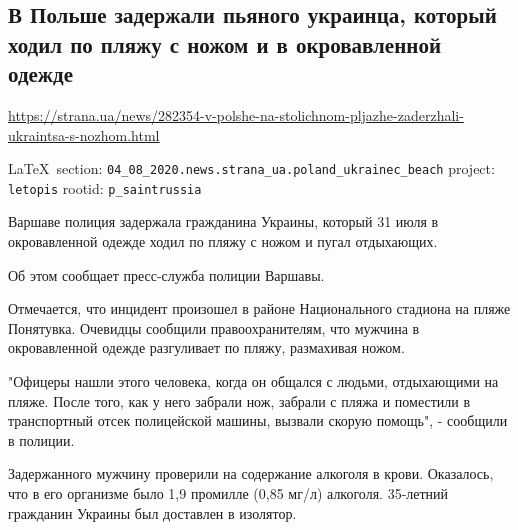 
 
\subsection{В Польше задержали пьяного украинца, который ходил по пляжу с ножом и в окровавленной одежде}
\url{https://strana.ua/news/282354-v-polshe-na-stolichnom-pljazhe-zaderzhali-ukraintsa-s-nozhom.html}
  
\vspace{0.5cm}
 {\ifDEBUG\small\LaTeX~section: \verb|04_08_2020.news.strana_ua.poland_ukrainec_beach| project: \verb|letopis| rootid: \verb|p_saintrussia| \fi}
\vspace{0.5cm}

Варшаве полиция задержала гражданина Украины, который 31 июля в окровавленной
одежде ходил по пляжу с ножом и пугал отдыхающих. 

Об этом сообщает пресс-служба полиции Варшавы.

Отмечается, что инцидент произошел в районе Национального стадиона на пляже
Понятувка. Очевидцы сообщили правоохранителям, что мужчина в окровавленной
одежде разгуливает по пляжу, размахивая ножом.

"Офицеры нашли этого человека, когда он общался с людьми, отдыхающими на пляже.
После того, как у него забрали нож, забрали с пляжа и поместили в транспортный
отсек полицейской машины, вызвали скорую помощь", - сообщили в полиции.

Задержанного мужчину проверили на содержание алкоголя в крови. Оказалось, что в
его организме было 1,9 промилле (0,85 мг/л) алкоголя. 35-летний гражданин
Украины был доставлен в изолятор.
  
